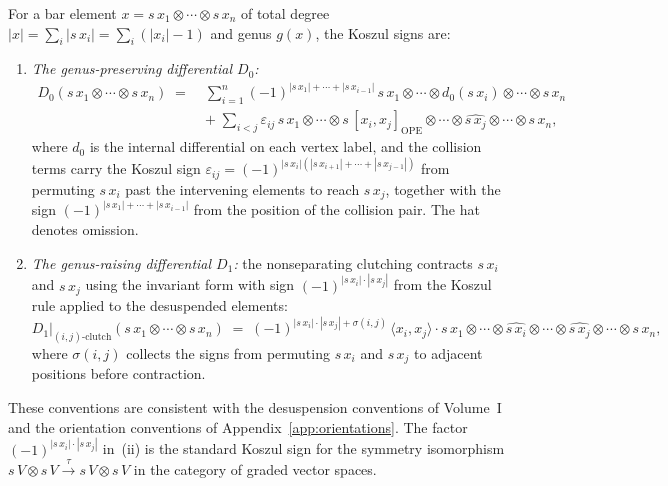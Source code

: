 \begin{remark}
\label{rem:rft-koszul-signs}
For a bar element
$x = s\,x_1 \otimes \cdots \otimes s\,x_n$ of total degree
$|x| = \sum_i |s\,x_i| = \sum_i (|x_i| - 1)$ and genus $g(x)$,
the Koszul signs are:
\begin{enumerate}[label=\textup{(\roman*)}]
\item \emph{The genus-preserving differential $D_0$:}
 \begin{align*}
 D_0(s\,x_1 \otimes \cdots \otimes s\,x_n)
 \;=\;
 &\sum_{i=1}^{n}
 (-1)^{|s\,x_1| + \cdots + |s\,x_{i-1}|}\,
 s\,x_1 \otimes \cdots \otimes d_0(s\,x_i)
 \otimes \cdots \otimes s\,x_n \\
 &+\; \sum_{i < j}
 \varepsilon_{ij}\,
 s\,x_1 \otimes \cdots
 \otimes s\,[x_i, x_j]_{\mathrm{OPE}}
 \otimes \cdots \otimes \widehat{s\,x_j}
 \otimes \cdots \otimes s\,x_n,
 \end{align*}
 where $d_0$ is the internal differential on each vertex
 label, and the collision terms carry the Koszul sign
 $\varepsilon_{ij} = (-1)^{|s\,x_i|(|s\,x_{i+1}| + \cdots
 + |s\,x_{j-1}|)}$ from permuting $s\,x_i$ past the
 intervening elements to reach $s\,x_j$, together with the
 sign $(-1)^{|s\,x_1| + \cdots + |s\,x_{i-1}|}$ from the
 position of the collision pair. The hat denotes omission.
\item \emph{The genus-raising differential $D_1$:}
 the nonseparating clutching contracts $s\,x_i$ and $s\,x_j$
 using the invariant form with sign
 $(-1)^{|s\,x_i| \cdot |s\,x_j|}$ from the Koszul rule
 applied to the desuspended elements:
 \[
 D_1\big|_{(i,j)\text{-clutch}}
 (s\,x_1 \otimes \cdots \otimes s\,x_n)
 \;=\;
 (-1)^{|s\,x_i| \cdot |s\,x_j|
 + \sigma(i,j)}
 \,\langle x_i, x_j \rangle
 \cdot
 s\,x_1 \otimes \cdots
 \otimes \widehat{s\,x_i}
 \otimes \cdots \otimes \widehat{s\,x_j}
 \otimes \cdots \otimes s\,x_n,
 \]
 where $\sigma(i,j)$ collects the signs from permuting
 $s\,x_i$ and $s\,x_j$ to adjacent positions before
 contraction.
\end{enumerate}
These conventions are consistent with the desuspension
conventions of Volume~I and the orientation conventions of
Appendix~\ref{app:orientations}. The factor
$(-1)^{|s\,x_i| \cdot |s\,x_j|}$ in~(ii) is the standard
Koszul sign for the symmetry isomorphism
$s\,V \otimes s\,V \xrightarrow{\tau} s\,V \otimes s\,V$
in the category of graded vector spaces.
\end{remark}


